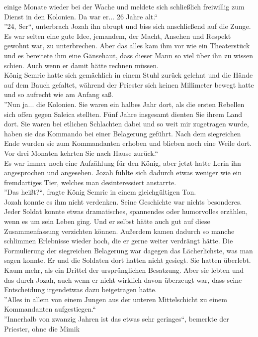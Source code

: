 einige Monate wieder bei der Wache und meldete sich schließlich freiwillig zum Dienst in den 
Kolonien. Da war er... 26 Jahre alt.``\\
''24, Ser``, unterbrach Jozah ihn abrupt und biss sich anschließend auf die Zunge. Es war selten 
eine gute Idee, jemandem, der Macht, Ansehen und Respekt gewohnt war, zu unterbrechen. Aber das 
alles kam ihm vor wie ein Theaterstück und es bereitete ihm eine Gänsehaut, dass dieser Mann so 
viel über ihn zu wissen schien. Auch wenn er damit hätte rechnen müssen.\\
König Semric hatte sich gemächlich in einem Stuhl zurück gelehnt und die Hände auf dem Bauch 
gefaltet, während der Priester sich keinen Millimeter bewegt hatte und so aufrecht wie am Anfang 
saß. \\
''Nun ja... die Kolonien. Sie waren ein halbes Jahr dort, als die ersten Rebellen sich offen gegen 
Saleica stellten. Fünf Jahre insgesamt dienten Sie ihrem Land dort. Sie waren bei etlichen 
Schlachten dabei und so weit mir zugetragen wurde, haben sie das Kommando bei einer Belagerung 
geführt. Nach dem siegreichen Ende wurden sie zum Kommandanten erhoben und blieben noch eine Weile 
dort. Vor drei Monaten kehrten Sie nach Hause zurück.``\\
Es war immer noch eine Aufzählung für den König, aber jetzt hatte Lerin ihn angesprochen und 
angesehen. Jozah fühlte sich dadurch etwas weniger wie ein fremdartiges Tier, welches man 
desinteressiert anstarrte. \\
''Das heißt?``, fragte König Semric in einem gleichgültigen Ton. \\
Jozah konnte es ihm nicht verdenken. Seine Geschichte war nichts besonderes. Jeder Soldat konnte 
etwas dramatisches, spannendes oder humorvolles erzählen, wenn es um sein Leben ging. Und er selbst 
hätte auch gut auf diese Zusammenfassung verzichten können. Außerdem kamen dadurch so manche 
schlimmen Erlebnisse wieder hoch, die er gerne weiter verdrängt hätte. Die Formulierung der 
siegreichen Belagerung war dagegen das Lächerlichste, was man sagen konnte. Er und die Soldaten 
dort hatten nicht gesiegt. Sie hatten überlebt. Kaum mehr, als ein Drittel der ursprünglichen 
Besatzung. Aber sie lebten und das durch Jozah, auch wenn er nicht wirklich davon überzeugt war, 
dass seine Entscheidung irgendetwas dazu beigetragen hatte.\\
''Alles in allem von einem Jungen aus der unteren Mittelschicht zu einem Kommandanten 
aufgestiegen.``\\
''Innerhalb von zwanzig Jahren ist das etwas sehr geringes``, bemerkte der Priester, ohne die Mimik 
